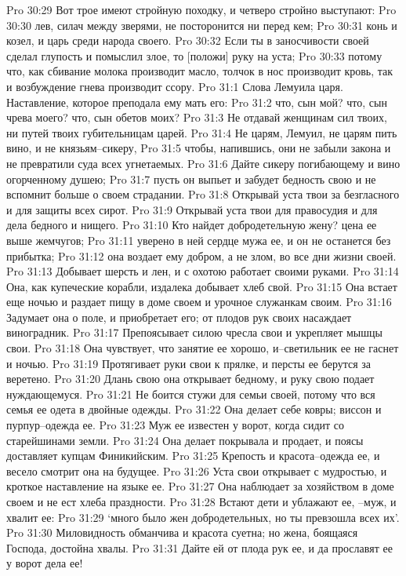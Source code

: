 Pro 30:29  Вот трое имеют стройную походку, и четверо стройно выступают:
Pro 30:30  лев, силач между зверями, не посторонится ни перед кем;
Pro 30:31  конь и козел, и царь среди народа своего.
Pro 30:32  Если ты в заносчивости своей сделал глупость и помыслил злое, то [положи] руку на уста;
Pro 30:33  потому что, как сбивание молока производит масло, толчок в нос производит кровь, так и возбуждение гнева производит ссору.
Pro 31:1  Слова Лемуила царя. Наставление, которое преподала ему мать его:
Pro 31:2  что, сын мой? что, сын чрева моего? что, сын обетов моих?
Pro 31:3  Не отдавай женщинам сил твоих, ни путей твоих губительницам царей.
Pro 31:4  Не царям, Лемуил, не царям пить вино, и не князьям--сикеру,
Pro 31:5  чтобы, напившись, они не забыли закона и не превратили суда всех угнетаемых.
Pro 31:6  Дайте сикеру погибающему и вино огорченному душею;
Pro 31:7  пусть он выпьет и забудет бедность свою и не вспомнит больше о своем страдании.
Pro 31:8  Открывай уста твои за безгласного и для защиты всех сирот.
Pro 31:9  Открывай уста твои для правосудия и для дела бедного и нищего.
Pro 31:10  Кто найдет добродетельную жену? цена ее выше жемчугов;
Pro 31:11  уверено в ней сердце мужа ее, и он не останется без прибытка;
Pro 31:12  она воздает ему добром, а не злом, во все дни жизни своей.
Pro 31:13  Добывает шерсть и лен, и с охотою работает своими руками.
Pro 31:14  Она, как купеческие корабли, издалека добывает хлеб свой.
Pro 31:15  Она встает еще ночью и раздает пищу в доме своем и урочное служанкам своим.
Pro 31:16  Задумает она о поле, и приобретает его; от плодов рук своих насаждает виноградник.
Pro 31:17  Препоясывает силою чресла свои и укрепляет мышцы свои.
Pro 31:18  Она чувствует, что занятие ее хорошо, и--светильник ее не гаснет и ночью.
Pro 31:19  Протягивает руки свои к прялке, и персты ее берутся за веретено.
Pro 31:20  Длань свою она открывает бедному, и руку свою подает нуждающемуся.
Pro 31:21  Не боится стужи для семьи своей, потому что вся семья ее одета в двойные одежды.
Pro 31:22  Она делает себе ковры; виссон и пурпур--одежда ее.
Pro 31:23  Муж ее известен у ворот, когда сидит со старейшинами земли.
Pro 31:24  Она делает покрывала и продает, и поясы доставляет купцам Финикийским.
Pro 31:25  Крепость и красота--одежда ее, и весело смотрит она на будущее.
Pro 31:26  Уста свои открывает с мудростью, и кроткое наставление на языке ее.
Pro 31:27  Она наблюдает за хозяйством в доме своем и не ест хлеба праздности.
Pro 31:28  Встают дети и ублажают ее, --муж, и хвалит ее:
Pro 31:29  `много было жен добродетельных, но ты превзошла всех их'.
Pro 31:30  Миловидность обманчива и красота суетна; но жена, боящаяся Господа, достойна хвалы.
Pro 31:31  Дайте ей от плода рук ее, и да прославят ее у ворот дела ее!


